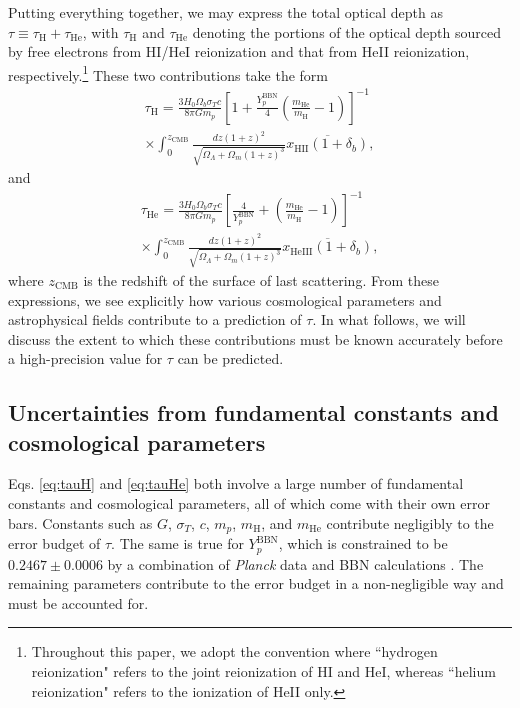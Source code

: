 \documentclass[twocolumn,aps,prd,nofootinbib,showpacs,superscriptaddress]{revtex4-1}
\begin{document}
Putting everything together, we may express the total optical depth as $\tau \equiv \tau_\textrm{H} + \tau_\textrm{He}$, with $\tau_\textrm{H}$ and $\tau_\textrm{He}$ denoting the portions of the optical depth sourced by free electrons from HI/HeI reionization and that from HeII reionization, respectively.\footnote{Throughout this paper, we adopt the convention where ``hydrogen reionization" refers to the joint reionization of HI and HeI, whereas ``helium reionization" refers to the ionization of HeII only.} These two contributions take the form
\begin{eqnarray}
\label{eq:tauH}
\tau_\textrm{H} = \frac{3 H_0 \Omega_b \sigma_Tc}{8 \pi G m_p} \left[ 1 + \frac{Y_p^\textrm{BBN}}{4}\left( \frac{m_\textrm{He}}{m_\textrm{H}} - 1\right)\right]^{-1} \nonumber \\
\times \int_0^{z_\textrm{CMB}} \frac{dz (1+z)^2}{\sqrt{\Omega_\Lambda + \Omega_m (1+z)^3}}  \overline{x_\textrm{HII} (1+\delta_b)},
\end{eqnarray} 
and
\begin{eqnarray}
\label{eq:tauHe}
\tau_\textrm{He} = \frac{3 H_0 \Omega_b \sigma_Tc}{8 \pi G m_p} \left[ \frac{4}{Y_p^\textrm{BBN}} + \left( \frac{m_\textrm{He}}{m_\textrm{H}} - 1\right)\right]^{-1} \nonumber \\
\times \int_0^{z_\textrm{CMB}} \frac{dz (1+z)^2}{\sqrt{\Omega_\Lambda + \Omega_m (1+z)^3}}  \overline{x_\textrm{HeIII} (1+\delta_b)},
\end{eqnarray}
where $z_\textrm{CMB}$ is the redshift of the surface of last scattering. From these expressions, we see explicitly how various cosmological parameters and astrophysical fields contribute to a prediction of $\tau$. In what follows, we will discuss the extent to which these contributions must be known accurately before a high-precision value for $\tau$ can be predicted.

\subsection{Uncertainties from fundamental constants and cosmological parameters}
\label{sec:CosmoParamUncertainties}
Eqs. \eqref{eq:tauH} and \eqref{eq:tauHe} both involve a large number of fundamental constants and cosmological parameters, all of which come with their own error bars. Constants such as $G$, $\sigma_T$, $c$, $m_p$, $m_\textrm{H}$, and $m_\textrm{He}$ contribute negligibly to the error budget of $\tau$. The same is true for $Y_p^\textrm{BBN}$, which is constrained to be $0.2467\pm0.0006$ by a combination of \emph{Planck} data and BBN calculations \cite{Planck2015parameters}. The remaining parameters contribute to the error budget in a non-negligible way and must be accounted for.
\end{document}
